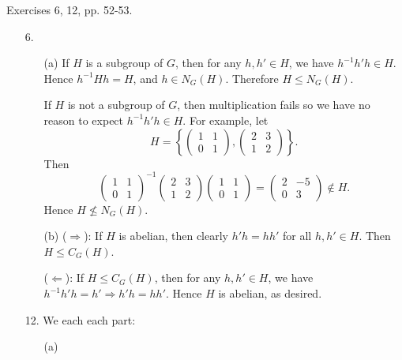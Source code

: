 \documentclass[12pt]{article}
\theoremstyle{remark}
\theoremstyle{named}
\renewcommand{\implies}{\Rightarrow}
\begin{document}
Exercises 6, 12, pp. 52-53.

\begin{enumerate}
    \item [6.]
    \begin{enumerate}
        \item [(a)] If \(H\) is a subgroup of \(G\), then for any \(h, h' \in H\), we have \(h^{-1}h'h \in H\). Hence \(h^{-1}Hh = H\), and \(h \in N_G(H)\). Therefore \(H \le N_G(H)\). 
        
        If \(H\) is not a subgroup of \(G\), then multiplication fails so we have no reason to expect \(h^{-1}h'h \in H\). For example, let 
        \[H = \left\{\begin{pmatrix}
            1 & 1 \\ 0 & 1
        \end{pmatrix}, \begin{pmatrix}
            2 & 3 \\ 1 & 2
        \end{pmatrix}\right\}.\]
    Then 
    \[\begin{pmatrix}
        1 & 1 \\ 0 & 1
    \end{pmatrix}^{-1} \begin{pmatrix}
        2 & 3 \\ 1 & 2
    \end{pmatrix} \begin{pmatrix}
        1 & 1 \\ 0 & 1
    \end{pmatrix} = \begin{pmatrix}
        2 & -5 \\ 0 & 3
    \end{pmatrix} \notin H.\]
    Hence \(H \nleq N_G(H)\).

    \item [(b)] (\(\implies\)): If \(H\) is abelian, then clearly \(h'h = hh'\) for all \(h, h' \in H\). Then \(H \le C_G(H)\).

    (\(\Leftarrow\)): If \(H \le C_G(H)\), then for any \(h, h' \in H\), we have \(h^{-1}h'h = h' \implies h'h = h h'\). Hence \(H\) is abelian, as desired.

    \end{enumerate}
    \item [12.] We each each part:
    \begin{enumerate}
        \item[(a)] 
    \end{enumerate}
\end{enumerate}
\end{document}
